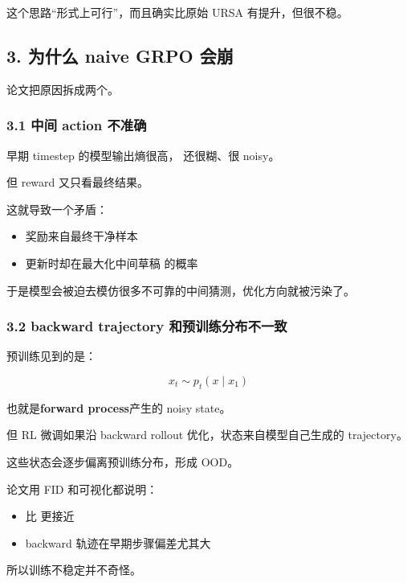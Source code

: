 这个思路“形式上可行”，而且确实比原始 URSA 有提升，但很不稳。

\subsection{3. 为什么 naive GRPO 会崩}

论文把原因拆成两个。

\subsubsection{3.1 中间 action 不准确}

早期 timestep 的模型输出熵很高， 还很糊、很 noisy。

但 reward 又只看最终结果。

这就导致一个矛盾：

\begin{itemize}[leftmargin=1.5em]
  \item 奖励来自最终干净样本 
  \item 更新时却在最大化中间草稿  的概率
\end{itemize}

于是模型会被迫去模仿很多不可靠的中间猜测，优化方向就被污染了。

\subsubsection{3.2 backward trajectory 和预训练分布不一致}

预训练见到的是：

\[
x_t \sim p_t(x \mid x_1)
\]

也就是\textbf{forward process}产生的 noisy state。

但 RL 微调如果沿 backward rollout 优化，状态来自模型自己生成的 trajectory。

这些状态会逐步偏离预训练分布，形成 OOD。

论文用 FID 和可视化都说明：

\begin{itemize}[leftmargin=1.5em]
  \item {} 比  更接近 
  \item backward 轨迹在早期步骤偏差尤其大
\end{itemize}

所以训练不稳定并不奇怪。

